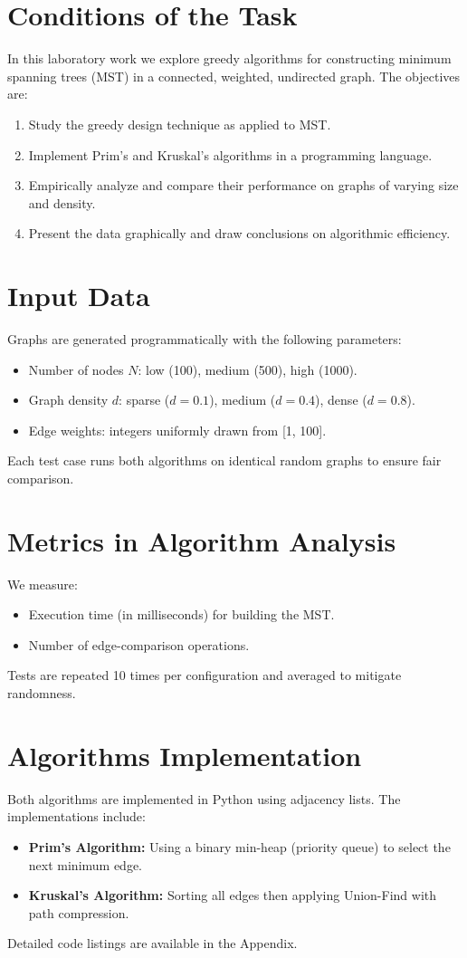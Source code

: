 \documentclass[12pt]{article}
\begin{document}
\section*{Conditions of the Task}
In this laboratory work we explore greedy algorithms for constructing minimum spanning trees (MST) in a connected, weighted, undirected graph. The objectives are:
\begin{enumerate}
    \item Study the greedy design technique as applied to MST.
    \item Implement Prim's and Kruskal's algorithms in a programming language.
    \item Empirically analyze and compare their performance on graphs of varying size and density.
    \item Present the data graphically and draw conclusions on algorithmic efficiency.
\end{enumerate}

\clearpage
\section*{Input Data}
Graphs are generated programmatically with the following parameters:
\begin{itemize}
  \item Number of nodes $N$: low (100), medium (500), high (1000).
  \item Graph density $d$: sparse ($d=0.1$), medium ($d=0.4$), dense ($d=0.8$).
  \item Edge weights: integers uniformly drawn from [1, 100].
\end{itemize}
Each test case runs both algorithms on identical random graphs to ensure fair comparison.

\clearpage
\section*{Metrics in Algorithm Analysis}
We measure:
\begin{itemize}
  \item Execution time (in milliseconds) for building the MST.
  \item Number of edge-comparison operations.
\end{itemize}
Tests are repeated 10 times per configuration and averaged to mitigate randomness.

\section*{Algorithms Implementation}
Both algorithms are implemented in Python using adjacency lists. The implementations include:
\begin{itemize}
  \item \textbf{Prim's Algorithm:} Using a binary min-heap (priority queue) to select the next minimum edge.
  \item \textbf{Kruskal's Algorithm:} Sorting all edges then applying Union-Find with path compression.
\end{itemize}
Detailed code listings are available in the Appendix.
\end{document}
